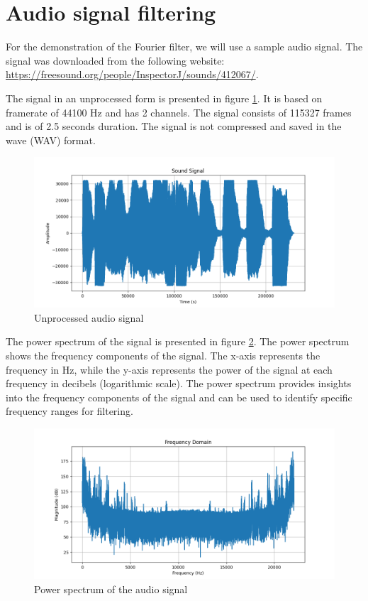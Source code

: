 \documentclass[a4paper,12pt,fleqn]{article}
\begin{document}
\section{Audio signal filtering}

\hspace{1 em} For the demonstration of the Fourier filter, we will use a sample audio signal.
The signal was downloaded from the following website: \url{https://freesound.org/people/InspectorJ/sounds/412067/}.

The signal in an unprocessed form is presented in figure \ref{fig:unprocessed_signal}. 
It is based on framerate of 44100 Hz and has 2 channels. The signal consists of 115327 frames and is of 2.5 seconds duration.
The signal is not compressed and saved in the wave (WAV) format.
\begin{figure}[H]
    \centering
    \includegraphics[width=1\textwidth]{unprocessed_signal.png}
    \caption{Unprocessed audio signal}
    \label{fig:unprocessed_signal}
\end{figure}

The power spectrum of the signal is presented in figure \ref{fig:power_spectrum}. The power spectrum
shows the frequency components of the signal. The x-axis represents the frequency in Hz, while the y-axis
represents the power of the signal at each frequency in decibels (logarithmic scale). The power spectrum provides insights into the frequency
components of the signal and can be used to identify specific frequency ranges for filtering.


\begin{figure}[H]
    \centering
    \includegraphics[width=1\textwidth]{frequency_domain.png}
    \caption{Power spectrum of the audio signal}
    \label{fig:power_spectrum}
\end{figure}
\end{document}
